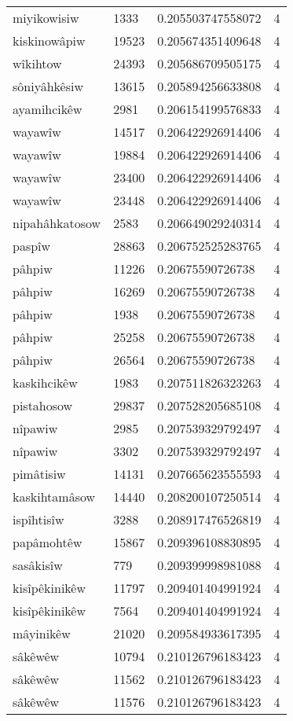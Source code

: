 \begin{longtable}{llll}
miyikowisiw & 1333 & 0.205503747558072 & 4 \\
kiskinowâpiw & 19523 & 0.205674351409648 & 4 \\
wîkihtow & 24393 & 0.205686709505175 & 4 \\
sôniyâhkêsiw & 13615 & 0.205894256633808 & 4 \\
ayamihcikêw & 2981 & 0.206154199576833 & 4 \\
wayawîw & 14517 & 0.206422926914406 & 4 \\
wayawîw & 19884 & 0.206422926914406 & 4 \\
wayawîw & 23400 & 0.206422926914406 & 4 \\
wayawîw & 23448 & 0.206422926914406 & 4 \\
nipahâhkatosow & 2583 & 0.206649029240314 & 4 \\
paspîw & 28863 & 0.206752525283765 & 4 \\
pâhpiw & 11226 & 0.20675590726738 & 4 \\
pâhpiw & 16269 & 0.20675590726738 & 4 \\
pâhpiw & 1938 & 0.20675590726738 & 4 \\
pâhpiw & 25258 & 0.20675590726738 & 4 \\
pâhpiw & 26564 & 0.20675590726738 & 4 \\
kaskihcikêw & 1983 & 0.207511826323263 & 4 \\
pistahosow & 29837 & 0.207528205685108 & 4 \\
nîpawiw & 2985 & 0.207539329792497 & 4 \\
nîpawiw & 3302 & 0.207539329792497 & 4 \\
pimâtisiw & 14131 & 0.207665623555593 & 4 \\
kaskihtamâsow & 14440 & 0.208200107250514 & 4 \\
ispîhtisîw & 3288 & 0.208917476526819 & 4 \\
papâmohtêw & 15867 & 0.209396108830895 & 4 \\
sasâkisîw & 779 & 0.209399998981088 & 4 \\
kisîpêkinikêw & 11797 & 0.209401404991924 & 4 \\
kisîpêkinikêw & 7564 & 0.209401404991924 & 4 \\
mâyinikêw & 21020 & 0.209584933617395 & 4 \\
sâkêwêw & 10794 & 0.210126796183423 & 4 \\
sâkêwêw & 11562 & 0.210126796183423 & 4 \\
sâkêwêw & 11576 & 0.210126796183423 & 4 \\

\end{longtable}
